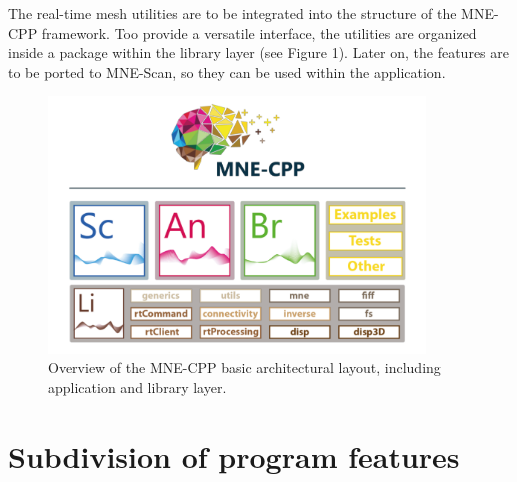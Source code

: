 \documentclass[a4paper, 11pt, english, fleqn]{article}
\begin{document}
The real-time mesh utilities are to be integrated into the structure of the MNE-CPP framework. Too provide a versatile interface, the utilities are organized inside a package within the library layer (see Figure 1). Later on, the features are to be ported to MNE-Scan, so they can be used within the application.
\begin{figure}[h]
	\begin{center}
		\includegraphics[width=10cm]{figures/mne_architecture.png}
		\caption{Overview of the MNE-CPP basic architectural layout, including application and library layer.}
	\end{center}
\end{figure}

\clearpage

\section{Subdivision of program features}
\end{document}
